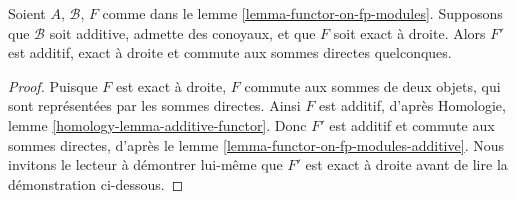 \begin{lemma}
\label{lemma-functor-on-fp-modules-right-exact}
Soient $A$, $\mathcal{B}$, $F$ comme dans le lemme \ref{lemma-functor-on-fp-modules}.
Supposons que $\mathcal{B}$ soit additive, admette des conoyaux, et que $F$ soit exact à droite. Alors
$F'$ est additif, exact à droite et commute aux sommes directes quelconques.
\end{lemma}

\begin{proof}
Puisque $F$ est exact à droite, $F$ commute aux sommes de deux objets, qui sont
représentées par les sommes directes. Ainsi $F$ est additif, d'après
Homologie, lemme \ref{homology-lemma-additive-functor}.
Donc $F'$ est additif et commute aux sommes directes, d'après le
lemme \ref{lemma-functor-on-fp-modules-additive}.
Nous invitons le lecteur à démontrer lui-même que $F'$ est exact à droite
avant de lire la démonstration ci-dessous.


\end{proof}
